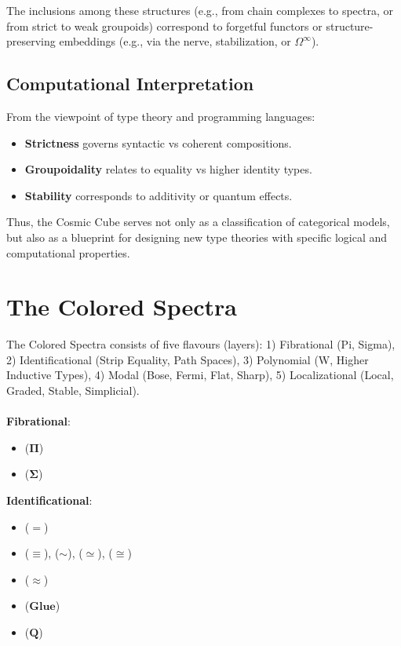\documentclass{article}
\begin{document}
The inclusions among these structures (e.g., from chain
complexes to spectra, or from strict to weak groupoids)
correspond to forgetful functors or structure-preserving
embeddings (e.g., via the nerve, stabilization, or $\Omega^\infty$).

\subsection{Computational Interpretation}

From the viewpoint of type theory and programming languages:

\begin{itemize}
\item \textbf{Strictness} governs syntactic vs coherent compositions.
\item \textbf{Groupoidality} relates to equality vs higher identity types.
\item \textbf{Stability} corresponds to additivity or quantum effects.
\end{itemize}

Thus, the Cosmic Cube serves not only as a classification of categorical models, but also as a blueprint for designing new type theories with specific logical and computational properties.

\section{The Colored Spectra}

The Colored Spectra consists of five flavours (layers):
1) Fibrational (Pi, Sigma),
2) Identificational (Strip Equality, Path Spaces),
3) Polynomial (W, Higher Inductive Types),
4) Modal (Bose, Fermi, Flat, Sharp),
5) Localizational (Local, Graded, Stable, Simplicial).
\\
\\
\noindent \textbf{Fibrational}:
\begin{itemize}
\item {} ($\mathbf{\Pi}$)
\item {} ($\mathbf{\Sigma}$)
\end{itemize}

\noindent \textbf{Identificational}:
\begin{itemize}
\item {} ($\mathbf{=}$)
\item {} ($\mathbf{\equiv}$),
       ($\mathbf{\sim}$),
       ($\mathbf{\simeq}$),
       ($\mathbf{\cong}$)
\item {} ($\mathbf{\approx}$)
\item {} ($\mathbf{Glue}$)
\item {} ($\mathbf{Q}$)
\end{itemize}
\end{document}
